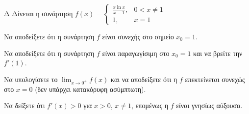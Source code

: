 \begin{thema}{Δ}
Δίνεται η συνάρτηση $f(x) = \begin{cases} \frac{x \ln x}{x-1}, & 0 < x \ne 1 \\ 1, & x = 1 \end{cases}$
\begin{erwthma}
    \item Να αποδείξετε ότι η συνάρτηση $f$ είναι συνεχής στο σημείο $x_0 = 1$.
    \item Να αποδείξετε ότι η συνάρτηση $f$ είναι παραγωγίσιμη στο $x_0 = 1$ και να βρείτε την $f'(1)$.
    \item Να υπολογίσετε το $\displaystyle\lim_{x \to 0^+} f(x)$ και να αποδείξετε ότι η $f$ επεκτείνεται συνεχώς στο $x=0$ (δεν υπάρχει κατακόρυφη ασύμπτωτη).
    \item Να δείξετε ότι $f'(x) > 0$ για $x > 0$, $x \ne 1$, επομένως η $f$ είναι γνησίως αύξουσα.
\end{erwthma}
\end{thema}
